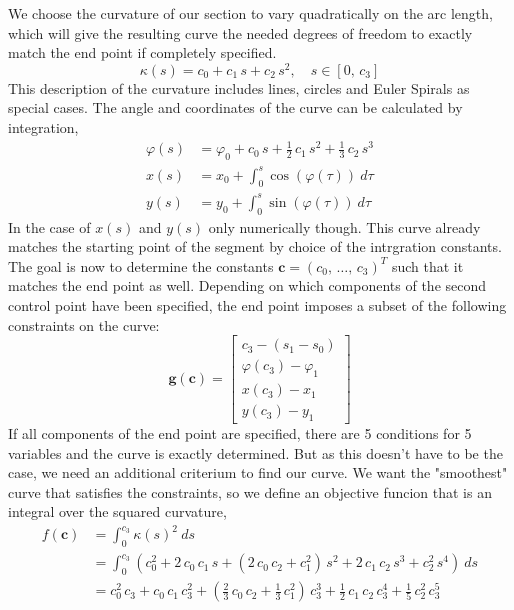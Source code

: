 We choose the curvature of our section to vary quadratically on the arc length, which will give the resulting curve the needed degrees of freedom to exactly match the end point if completely specified.
%
\begin{equation}
\kappa(s) = c_0 + c_1\,s + c_2\,s^2,\quad s \in [0,\,c_3]
\end{equation}
%
This description of the curvature includes lines, circles and Euler Spirals as special cases.
The angle and coordinates of the curve can be calculated by integration,
%
\begin{align}
\varphi(s) &= \varphi_0 + c_0\,s + \frac{1}{2}\,c_1\,s^2 + \frac{1}{3}\,c_2\,s^3\\
x(s) &= x_0 + \int_{0}^{s} \cos(\varphi(\tau))\ d\tau \\
y(s) &= y_0 + \int_{0}^{s} \sin(\varphi(\tau))\ d\tau
\end{align}
%
In the case of $x(s)$ and $y(s)$ only numerically though.
This curve already matches the starting point of the segment by choice of the intrgration constants.
The goal is now to determine the constants $\boldsymbol{c} = (c_0,\,\ldots,\,c_3)^T$ such that it matches the end point as well.
Depending on which components of the second control point have been specified, the end point imposes a subset of the following constraints on the curve:
%
\begin{equation}
\boldsymbol{g}(\boldsymbol{c}) =
\begin{bmatrix}
c_3 - (s_1 - s_0) \\
\varphi(c_3) - \varphi_1 \\
x(c_3) - x_1 \\
y(c_3) - y_1
\end{bmatrix}
\end{equation}
%
If all components of the end point are specified, there are 5 conditions for 5 variables and the curve is exactly determined.
But as this doesn't have to be the case, we need an additional criterium to find our curve.
We want the "smoothest" curve that satisfies the constraints, so we define an objective funcion that is an integral over the squared curvature,
%
\begin{align*}
f(\boldsymbol{c}) &= \int_0^{c_3} \kappa(s)^2\ ds \\
&= \int_0^{c_3}\left(c_0^2 + 2\,c_0\,c_1\,s + (2\,c_0\,c_2 + c_1^2)\,s^2 + 2\,c_1\,c_2\,s^3 + c_2^2\,s^4\right)\ ds \\
&= c_0^2\,c_3 + c_0\,c_1\,c_3^2 + \left(\frac{2}{3}\,c_0\,c_2 + \frac{1}{3}\,c_1^2\right)\,c_3^3 + \frac{1}{2}\,c_1\,c_2\,c_3^4 + \frac{1}{5}\,c_2^2\,c_3^5
\end{align*}
